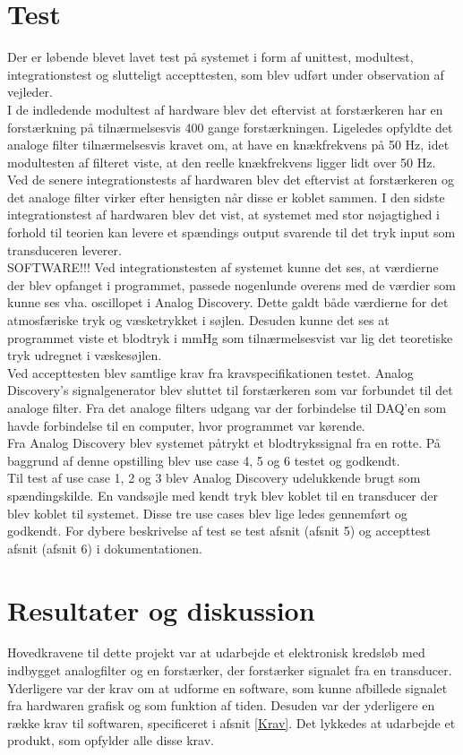\section{Test}
Der er løbende blevet lavet test på systemet i form af unittest, modultest, integrationstest og slutteligt accepttesten, som blev udført under observation af vejleder.\\ 
I de indledende modultest af hardware blev det eftervist at forstærkeren har en forstærkning på tilnærmelsesvis 400 gange forstærkningen. Ligeledes opfyldte det analoge filter tilnærmelsesvis kravet om, at have en knækfrekvens på 50 Hz, idet modultesten af filteret viste, at den reelle knækfrekvens ligger lidt over 50 Hz. Ved de senere integrationstests af hardwaren blev det eftervist at forstærkeren og det analoge filter virker efter hensigten når disse er koblet sammen. I den sidste integrationstest af hardwaren blev det vist, at systemet med stor nøjagtighed i forhold til teorien kan levere et spændings output svarende til det tryk input som transduceren leverer.\\
SOFTWARE!!!
Ved integrationstesten af systemet kunne det ses, at værdierne der blev opfanget i programmet, passede nogenlunde overens med de værdier som kunne ses vha. oscillopet i Analog Discovery. Dette galdt både værdierne for det atmosfæriske tryk og væsketrykket i søjlen. Desuden kunne det ses at programmet viste et blodtryk i mmHg som tilnærmelsesvist var lig det teoretiske tryk udregnet i væskesøjlen. \\
Ved accepttesten blev samtlige krav fra kravspecifikationen testet. Analog Discovery's signalgenerator blev sluttet til forstærkeren som var forbundet til det analoge filter. Fra det analoge filters udgang var der forbindelse til DAQ'en som havde forbindelse til en computer, hvor programmet var kørende.\\
Fra Analog Discovery blev systemet påtrykt et blodtrykssignal fra en rotte. På baggrund af denne opstilling blev use case 4, 5 og 6 testet og godkendt.\\
Til test af use case 1, 2 og 3 blev Analog Discovery udelukkende brugt som spændingskilde. En vandsøjle med kendt tryk blev koblet til en transducer der blev koblet til systemet. Disse tre use cases blev lige ledes gennemført og godkendt. For dybere beskrivelse af test se test afsnit (afsnit 5) og accepttest afsnit (afsnit 6) i dokumentationen.

\section{Resultater og diskussion}
Hovedkravene til dette projekt var at udarbejde et elektronisk kredsløb med indbygget analogfilter og en forstærker, der forstærker signalet fra en transducer. Yderligere var der krav om at udforme en software, som kunne afbillede signalet fra hardwaren grafisk og som funktion af tiden. Desuden var der yderligere en række krav til softwaren, specificeret i afsnit \ref{Krav}. Det lykkedes at udarbejde et produkt, som opfylder alle disse krav. \\[1ex]

